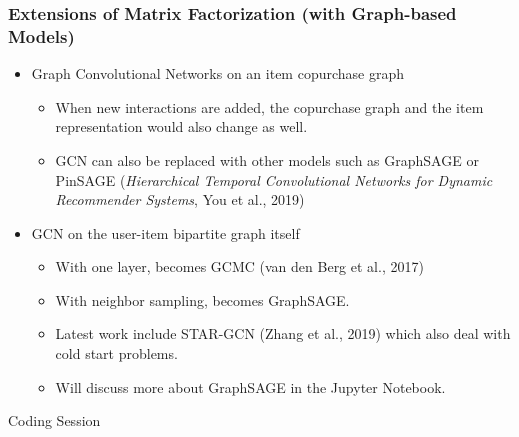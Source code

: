 \documentclass[11pt]{beamer}
\begin{document}
	\begin{frame}
		\frametitle{Extensions of Matrix Factorization \tiny (with Graph-based Models)}
		\begin{itemize}
			\item Graph Convolutional Networks on an item copurchase graph
			\begin{itemize}
				\item When new interactions are added, the copurchase graph and the item representation would also change as well.
				\item GCN can also be replaced with other models such as GraphSAGE or PinSAGE (\textit{Hierarchical Temporal Convolutional Networks for Dynamic Recommender Systems}, You et al., 2019)
			\end{itemize}
			\item GCN on the user-item bipartite graph itself
			\begin{itemize}
				\item With one layer, becomes GCMC (van den Berg et al., 2017)
				\item With neighbor sampling, becomes GraphSAGE.
				\item Latest work include STAR-GCN (Zhang et al., 2019) which also deal with cold start problems.
				\item Will discuss more about GraphSAGE in the Jupyter Notebook.
			\end{itemize}
		\end{itemize}
	\end{frame}

	\begin{frame}
		\begin{center}
			\centering
			\Huge Coding Session
		\end{center}
	\end{frame}
\end{document}
